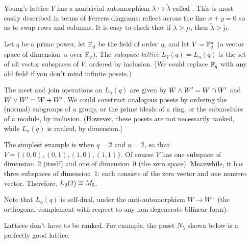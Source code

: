 Young's lattice $Y$ has a nontrivial automorphism $\lambda\mapsto\tilde\lambda$
called .
This is most easily described in terms of Ferrers diagrams: reflect across the line
$x+y=0$ so as to swap rows and columns.  It is easy to check that if $\lambda\geq\mu$, then
$\tilde\lambda\geq\tilde\mu$.

\begin{example}
Let $q$ be a prime power, let $\mathbb{F}_q$ be the field of order~$q$,
and let $V=\mathbb{F}_q^n$ (a vector space of dimension~$n$ over $\mathbb{F}_q$).  The \emph{subspace lattice}
$L_V(q)=L_n(q)$ is the set of all vector subspaces of $V$, ordered by inclusion.  (We could replace
$\mathbb{F}_q$ with any old field if you don't mind infinite posets.)

The meet and join operations on $L_n(q)$ are given by $W\wedge W'=W\cap W'$
and $W\vee W'=W+W'$.  We could construct analogous posets by
ordering the (normal) subgroups of a group, or the prime ideals of a ring, or the
submodules of a module, by inclusion.  (However, these posets are not necessarily
ranked, while $L_n(q)$ is ranked, by dimension.)

The simplest example is when $q=2$ and $n=2$, so that $V=\{(0,0),(0,1),(1,0),(1,1)\}$.
Of course $V$ has one subspace of dimension~2 (itself) and one of dimension~0 (the zero space).
Meanwhile, it has three subspaces of dimension~1; each consists of the zero vector and
one nonzero vector.  Therefore, $L_2(2)\cong M_5$.
\begin{center}
\end{center}
Note that $L_n(q)$ is self-dual, under the anti-automorphism $W\to W^\perp$ (the orthogonal complement with respect to any non-degenerate bilinear form).
\end{example}

\begin{example}
Lattices don't have to be ranked.  For example, the poset $N_5$ shown below is a
perfectly good lattice.
\begin{center}
\end{center}
\end{example}

